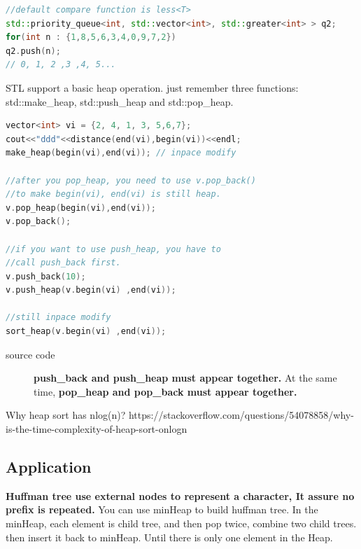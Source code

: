 \documentclass[a4paper,11pt,twoside]{book}
\begin{document}
\begin{lstlisting}[frame=single, language=c++, mathescape=true, basicstyle=\scriptsize]
//default compare function is less<T>
std::priority_queue<int, std::vector<int>, std::greater<int> > q2;
for(int n : {1,8,5,6,3,4,0,9,7,2})
q2.push(n);
// 0, 1, 2 ,3 ,4, 5...		
\end{lstlisting}


	\par STL support a basic heap operation. just remember three functions: std::make\_heap, std::push\_heap and std::pop\_heap.

\begin{lstlisting}[frame=single, language=c++, mathescape=true]
vector<int> vi = {2, 4, 1, 3, 5,6,7};
cout<<"ddd"<<distance(end(vi),begin(vi))<<endl;
make_heap(begin(vi),end(vi)); // inpace modify

//after you pop_heap, you need to use v.pop_back()
//to make begin(vi), end(vi) is still heap. 
v.pop_heap(begin(vi),end(vi));
v.pop_back();

//if you want to use push_heap, you have to 
//call push_back first. 
v.push_back(10);
v.push_heap(v.begin(vi) ,end(vi));

//still inpace modify
sort_heap(v.begin(vi) ,end(vi));	
\end{lstlisting}
\begin{description}
	\item[source code] \textbf{push\_back and push\_heap must appear together.} At the same time, \textbf{pop\_heap and pop\_back must appear together. }
\end{description}


\par Why heap sort has nlog(n)? https://stackoverflow.com/questions/54078858/why-is-the-time-complexity-of-heap-sort-onlogn

\subsection{Application}


\par \textbf{Huffman tree use external nodes to represent a character, It assure no prefix is repeated.} You can use minHeap to build huffman tree. In the minHeap, each element is child tree, and then pop twice, combine two child trees. then insert it back to minHeap. Until there is only one element in the Heap. 
\end{document}
